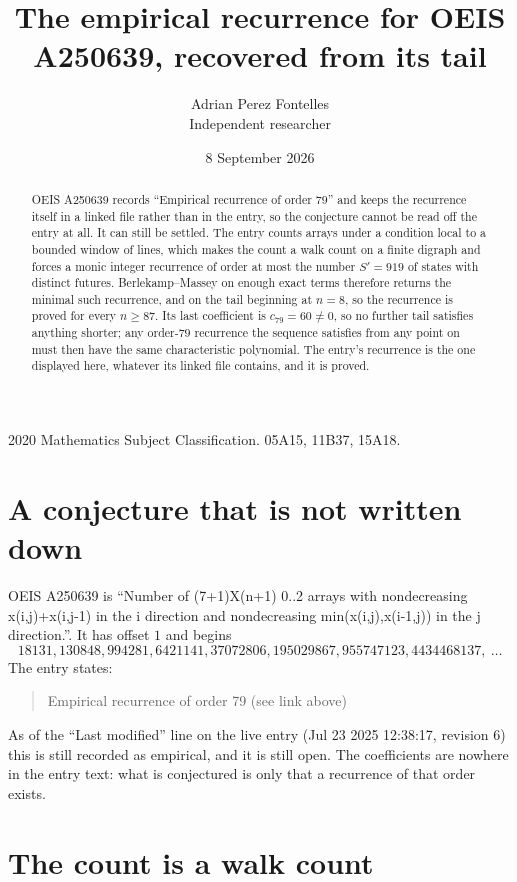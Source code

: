 \documentclass[11pt,a4paper]{article}
\title{The empirical recurrence for OEIS A250639, recovered from its tail}
\author{Adrian Perez Fontelles\\ \small Independent researcher}
\date{8 September 2026}
\theoremstyle{plain}
\theoremstyle{definition}
\begin{document}
\maketitle

\begin{abstract}
OEIS A250639 records ``Empirical recurrence of order $79$'' and keeps the recurrence itself in
a linked file rather than in the entry, so the conjecture cannot be read off the entry at all.
It can still be settled. The entry counts arrays under a condition local to a bounded window of
lines, which makes the count a walk count on a finite digraph and forces a monic integer
recurrence of order at most the number $S'=919$ of states with distinct futures. Berlekamp--Massey on
enough exact terms therefore returns the minimal such recurrence, and on the tail beginning at $n=8$, so the recurrence is proved for every $n\ge87$.
Its last coefficient is $c_{79}=60\neq0$, so no further tail satisfies anything
shorter; any order-$79$ recurrence the sequence satisfies from any point on must then have
the same characteristic polynomial. The entry's recurrence is the one displayed here, whatever
its linked file contains, and it is proved.
\end{abstract}

\noindent\small 2020 Mathematics Subject Classification. 05A15, 11B37, 15A18.\normalsize

\section{A conjecture that is not written down}

OEIS A250639 is ``Number of (7+1)X(n+1) 0..2 arrays with nondecreasing x(i,j)+x(i,j-1) in the i direction and nondecreasing min(x(i,j),x(i-1,j)) in the j direction.''. It has offset $1$ and begins
\[
18131, 130848, 994281, 6421141, 37072806, 195029867, 955747123, 4434468137,\ \dots
\]
The entry states:
\begin{quote}
Empirical recurrence of order 79 (see link above)
\end{quote}
As of the ``Last modified'' line on the live entry (Jul 23 2025 12:38:17, revision 6)
this is still recorded as empirical, and it is still open. The coefficients are nowhere in the
entry text: what is conjectured is only that a recurrence of that order exists.

\section{The count is a walk count}
\end{document}
